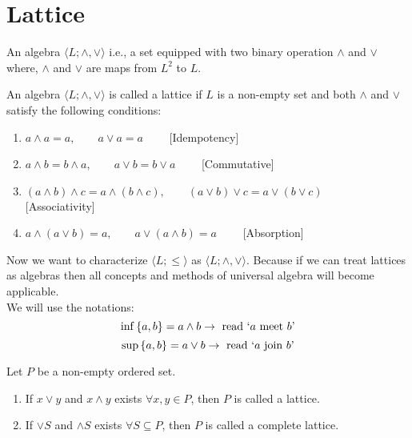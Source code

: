 \documentclass[../main-sheet.tex]{subfiles}
\begin{document}
\chapter{Lattice}
\begin{defn}
    An algebra \(\langle L;\wedge,\vee\rangle\) i.e., a set equipped with two binary operation \(\wedge\) and \(\vee\) where, \(\wedge\) and \(\vee\) are maps from \(L^2\) to \(L\).
\end{defn}
\begin{defn}
    An algebra \(\langle L;\wedge, \vee\rangle\) is called a lattice if \(L\) is a non-empty set and both \(\wedge\) and \(\vee\) satisfy the following conditions:
    \begin{enumerate}[label=(\roman*)]
        \item \(a\wedge a=a,\qquad a\vee a=a\qquad \) [Idempotency]
        \item \(a\wedge b=b\wedge a,\qquad a\vee b=b\vee a\qquad \) [Commutative]
        \item \((a\wedge b)\wedge c=a\wedge (b\wedge c),\qquad (a\vee b)\vee c=a\vee (b\vee c) \qquad \) [Associativity]
        \item \(a\wedge (a\vee b)=a,\qquad a\vee (a\wedge b)=a\qquad \) [Absorption]
    \end{enumerate}
\end{defn}


Now we want to characterize \(\langle L;\leq\rangle\) as \(\langle L;\wedge,\vee\rangle\). Because if we can treat lattices as algebras then all concepts and methods of universal algebra will become applicable.\\
We will use the notations:
\[\inf \left\{a,b\right\}=a\wedge b\to \text{ read `\(a\) meet \(b\)'}\]
\[\sup \left\{a,b\right\}=a\vee b\to \text{ read `\(a\) join \(b\)'}\]
\begin{defn}
    Let \(P\) be a non-empty ordered set.
    \begin{enumerate}[label=(\roman*)]
        \item If \(x\vee y\) and \(x\wedge y\) exists \(\forall x,y\in P\), then \(P\) is called a lattice.
        \item If \(\vee S\) and \(\wedge S\) exists \(\forall S\subseteq P\), then \(P\) is called a complete lattice.
    \end{enumerate}
\end{defn}
\end{document}
